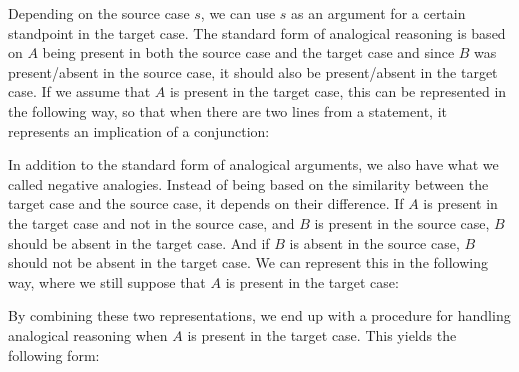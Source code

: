 		Depending on the source case $s$, we can use $s$ as an argument for a certain standpoint in the target case. The standard form of analogical reasoning is based on $A$ being present in both the source case and the target case and since $B$ was present/absent in the source case, it should also be present/absent in the target case. If we assume that $A$ is present in the target case, this can be represented in the following way, so that when there are two lines from a statement, it represents an implication of a conjunction: \medskip
			
			\noindent\begin{minipage}{0.9\textwidth}
			\end{minipage}	\medskip	
			
		In addition to the standard form of analogical arguments, we also have what we called negative analogies. Instead of being based on the similarity between the target case and the source case, it depends on their difference. If $A$ is present in the target case and not in the source case, and $B$ is present in the source case, $B$ should be absent in the target case. And if $B$ is absent in the source case, $B$ should not be absent in the target case. We can represent this in the following way, where we still suppose that $A$ is present in the target case: \medskip
			
			\noindent\begin{minipage}{0.9\textwidth}
			\end{minipage}\medskip

		
		By combining these two representations, we end up with a procedure for handling analogical reasoning when $A$ is present in the target case. This yields the following form:\medskip
			
			\noindent\begin{minipage}{0.9\textwidth}
			\end{minipage}\medskip	
		
